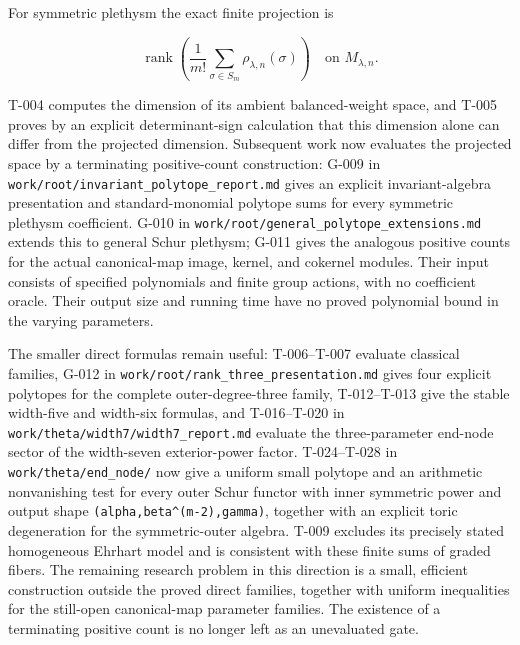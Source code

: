 \documentclass[
  10pt,
]{article}
\begin{document}
For symmetric plethysm the exact finite projection is

\[
\operatorname{rank}\left(\frac1{m!}\sum_{\sigma\in S_m}
\rho_{\lambda,n}(\sigma)\right)
\quad\text{on }M_{\lambda,n}.
\]

T-004 computes the dimension of its ambient balanced-weight space, and
T-005 proves by an explicit determinant-sign calculation that this
dimension alone can differ from the projected dimension. Subsequent work
now evaluates the projected space by a terminating positive-count
construction: G-009 in
\texttt{\small work/\allowbreak{}root/\allowbreak{}invariant\_\allowbreak{}polytope\_\allowbreak{}report.md}
gives an explicit invariant-algebra presentation and standard-monomial
polytope sums for every symmetric plethysm coefficient. G-010 in
\texttt{\small work/\allowbreak{}root/\allowbreak{}general\_\allowbreak{}polytope\_\allowbreak{}extensions.md}
extends this to general Schur plethysm; G-011 gives the analogous
positive counts for the actual canonical-map image, kernel, and cokernel
modules. Their input consists of specified polynomials and finite group
actions, with no coefficient oracle. Their output size and running time
have no proved polynomial bound in the varying parameters.

The smaller direct formulas remain useful: T-006--T-007 evaluate
classical families, G-012 in
\texttt{\small work/\allowbreak{}root/\allowbreak{}rank\_\allowbreak{}three\_\allowbreak{}presentation.md}
gives four explicit polytopes for the complete outer-degree-three
family, T-012--T-013 give the stable width-five and width-six formulas,
and T-016--T-020 in
\texttt{\small work/\allowbreak{}theta/\allowbreak{}width7/\allowbreak{}width7\_\allowbreak{}report.md}
evaluate the three-parameter end-node sector of the width-seven
exterior-power factor. T-024--T-028 in
\texttt{\small work/\allowbreak{}theta/\allowbreak{}end\_\allowbreak{}node/\allowbreak{}}
now give a uniform small polytope and an arithmetic nonvanishing test
for every outer Schur functor with inner symmetric power and output
shape
\texttt{\small (\allowbreak{}alpha,\allowbreak{}beta\textasciicircum{}(\allowbreak{}m-\allowbreak{}2)\allowbreak{},\allowbreak{}gamma)\allowbreak{}},
together with an explicit toric degeneration for the symmetric-outer
algebra. T-009 excludes its precisely stated homogeneous Ehrhart model
and is consistent with these finite sums of graded fibers. The remaining
research problem in this direction is a small, efficient construction
outside the proved direct families, together with uniform inequalities
for the still-open canonical-map parameter families. The existence of a
terminating positive count is no longer left as an unevaluated gate.
\end{document}
